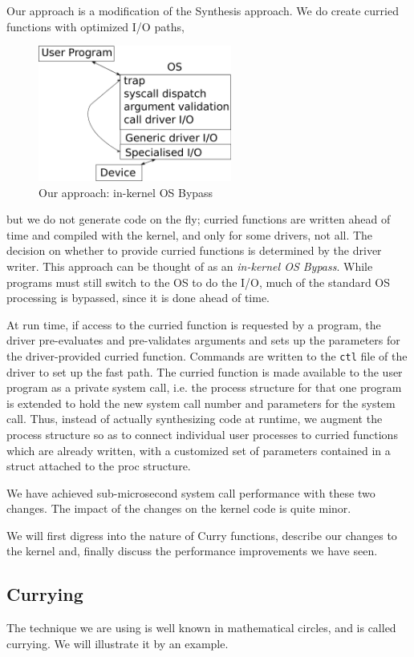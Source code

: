 \documentclass[letterpaper,twocolumn,10pt]{article}
\begin{document}
Our approach is a modification of the Synthesis approach. We do create curried functions with optimized I/O paths, 
\begin{figure}
\includegraphics[width=2.5in]{curry}
\caption{\label{curry}Our approach: in-kernel OS Bypass}
\end{figure}
but we do not generate code on the fly; curried functions are written ahead of time and compiled with the kernel, and only for some drivers, not all. The decision 
on whether to provide curried functions is determined by the driver writer. 
This approach can be thought of as an {\em in-kernel OS Bypass}. While programs must still switch to the OS to do the I/O, much of the standard OS processing is bypassed, since it is done ahead of time. 

At run time, if access to the curried function is requested by a program, 
the driver  pre-evaluates and pre-validates arguments and sets up the parameters for the driver-provided curried function. 
Commands are written to the {\tt ctl} file of the driver to set up the fast path. 
The 
curried function is made available to the user program as a private system call, i.e. the process structure for 
that one program is extended to hold the new system call number and parameters for the system call. 
Thus, instead of actually synthesizing code at runtime, we augment the process structure so as to 
connect individual user processes to curried 
functions which are already written, with a customized set of parameters contained in a struct attached to the proc structure. 

We have achieved sub-microsecond system call performance with these two changes. The impact of the 
changes on the kernel code is quite minor. 

We will first digress into the nature of Curry functions, describe our changes to the kernel and, finally discuss the 
performance improvements we have seen. 

\subsection{Currying}
The technique we are using is well known in mathematical circles, and is called currying. 
We will illustrate it by an example. 
\end{document}
